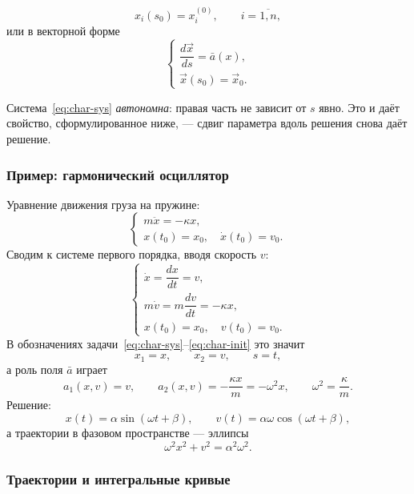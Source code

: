 \begin{equation}\tag{4}\label{eq:char-init}
  x_i(s_0) = x_i^{(0)}, \qquad i = \overline{1,n} ,
\end{equation}
или в векторной форме
\[
  \begin{cases}
    \dfrac{d\vec x}{ds} = \bar a(x), \\[8pt]
    \vec x(s_0) = \vec x_0 .
  \end{cases}
\]

\begin{idea}
Система~\eqref{eq:char-sys} \emph{автономна}: правая часть не зависит от $s$
явно. Это и даёт свойство, сформулированное ниже, — сдвиг параметра вдоль
решения снова даёт решение.
\end{idea}

\subsubsection*{Пример: гармонический осциллятор}

\begin{example}
Уравнение движения груза на пружине:
\[
  \begin{cases}
    m\ddot x = -\kappa x, \\
    x(t_0) = x_0, \quad \dot x(t_0) = v_0 .
  \end{cases}
\]
Сводим к системе первого порядка, вводя скорость $v$:
\[
  \begin{cases}
    \dot x = \dfrac{dx}{dt} = v, \\[6pt]
    m\dot v = m\dfrac{dv}{dt} = -\kappa x, \\[6pt]
    x(t_0) = x_0, \quad v(t_0) = v_0 .
  \end{cases}
\]
В обозначениях задачи~\eqref{eq:char-sys}--\eqref{eq:char-init} это значит
\[
  x_1 = x, \qquad x_2 = v, \qquad s = t ,
\]
а роль поля $\bar a$ играет
\[
  a_1(x,v) = v, \qquad a_2(x,v) = -\frac{\kappa x}{m} = -\omega^2 x,
  \qquad \omega^2 = \frac{\kappa}{m} .
\]
Решение:
\[
  x(t) = \alpha \sin(\omega t + \beta), \qquad
  v(t) = \alpha \omega \cos(\omega t + \beta) ,
\]
а траектории в фазовом пространстве — эллипсы
\[
  \omega^2 x^2 + v^2 = \alpha^2 \omega^2 .
\]
\end{example}

\subsubsection*{Траектории и интегральные кривые}

